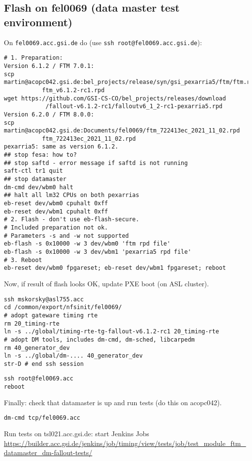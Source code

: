 \documentclass[12pt,a4paper]{report}
\begin{document}
\subsection{Flash on fel0069 (data master test environment)}
On \texttt{fel0069.acc.gsi.de} do (use \texttt{ssh root@fel0069.acc.gsi.de}):
\begin{verbatim}
# 1. Preparation:
Version 6.1.2 / FTM 7.0.1:
scp martin@acopc042.gsi.de:bel_projects/release/syn/gsi_pexarria5/ftm/ftm.rpd
           ftm_v6.1.2-rc1.rpd
wget https://github.com/GSI-CS-CO/bel_projects/releases/download
            /fallout-v6.1.2-rc1/falloutv6_1_2-rc1-pexarria5.rpd
Version 6.2.0 / FTM 8.0.0:
scp martin@acopc042.gsi.de:Documents/fel0069/ftm_722413ec_2021_11_02.rpd
           ftm_722413ec_2021_11_02.rpd
pexarria5: same as version 6.1.2.
## stop fesa: how to?
## stop saftd - error message if saftd is not running
saft-ctl tr1 quit
## stop datamaster
dm-cmd dev/wbm0 halt
## halt all lm32 CPUs on both pexarrias
eb-reset dev/wbm0 cpuhalt 0xff
eb-reset dev/wbm1 cpuhalt 0xff
# 2. Flash - don't use eb-flash-secure.
# Included preparation not ok.
# Parameters -s and -w not supported
eb-flash -s 0x10000 -w 3 dev/wbm0 'ftm rpd file'
eb-flash -s 0x10000 -w 3 dev/wbm1 'pexarria5 rpd file'
# 3. Reboot
eb-reset dev/wbm0 fpgareset; eb-reset dev/wbm1 fpgareset; reboot
\end{verbatim}
Now, if result of flash looks OK, update PXE boot (on ASL cluster).
\begin{verbatim}
ssh mskorsky@asl755.acc
cd /common/export/nfsinit/fel0069/
# adopt gateware timing rte
rm 20_timing-rte
ln -s ../global/timing-rte-tg-fallout-v6.1.2-rc1 20_timing-rte
# adopt DM tools, includes dm-cmd, dm-sched, libcarpedm
rm 40_generator_dev
ln -s ../global/dm-.... 40_generator_dev
str-D # end ssh session
\end{verbatim}
\begin{verbatim}
ssh root@fel0069.acc
reboot
\end{verbatim}
Finally: check that datamaster is up and run tests (do this on acopc042).
\begin{verbatim}
dm-cmd tcp/fel0069.acc
\end{verbatim}
Run tests on tsl021.acc.gsi.de: start Jenkins Jobs \url{https://builder.acc.gsi.de/jenkins/job/timing/view/tests/job/test_module_ftm_datamaster_dm-fallout-tests/}
\end{document}
